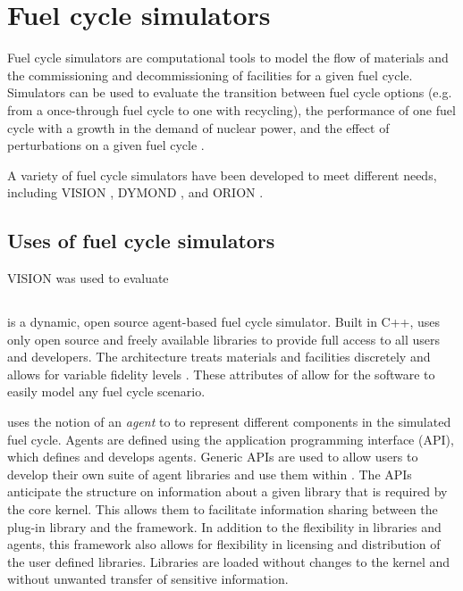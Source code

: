 \section{Fuel cycle simulators}
Fuel cycle simulators are computational tools to model the flow of materials
and the commissioning and decommissioning of facilities for a given fuel 
cycle. Simulators can be used to evaluate the transition between fuel cycle 
options (e.g. from a once-through fuel cycle to one with recycling), the 
performance of one fuel cycle with a growth in the demand of nuclear power, 
and the effect of perturbations on a given fuel cycle \cite{piet_dynamic_2011}. 

A variety of fuel cycle simulators have been developed to meet 
different needs, including VISION \cite{yacout_visionverifiable_2006}, 
DYMOND \cite{yacout_visionverifiable_2006}, and ORION \cite{gregg_analysis_2012}. 

\subsection{Uses of fuel cycle simulators}
VISION was used to evaluate 

\subsection{\Cyclus}
\Cyclus is a dynamic, open source agent-based fuel cycle simulator. Built 
in C++, \Cyclus uses only open source and freely available libraries to 
provide full access to all users and developers. The 
\Cyclus architecture treats materials and facilities discretely and allows 
for variable fidelity levels \cite{huff_fundamental_2016}. These attributes
of \Cyclus allow for the software to easily model any fuel cycle scenario.

\Cyclus uses the notion of an \textit{agent} to to represent different 
components in the simulated fuel cycle. Agents are 
defined using the \Cyclus application programming interface (API), which 
defines and develops agents. Generic APIs are used to allow users 
to develop their own suite of agent libraries and use them within \Cyclus. 
The APIs anticipate the structure on information about a given library 
that is required by the core \Cyclus kernel. This allows them to facilitate 
information sharing between the plug-in library and the \Cyclus framework. 
In addition to the flexibility in libraries and agents, this framework 
also allows for flexibility in licensing and distribution of the user 
defined libraries. Libraries are loaded without changes to the \Cyclus 
kernel and without unwanted transfer of sensitive information. 


